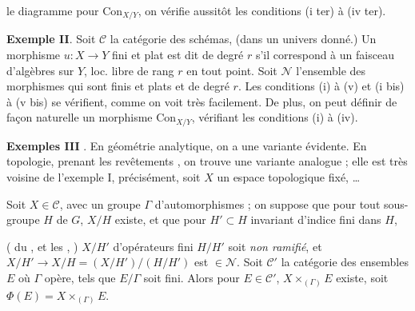 \documentclass[11pt,a4paper]{article}
\begin{document}
le diagramme pour $\mathrm{Con}_{X/Y}$, on vérifie aussitôt les conditions
(i ter) à (iv ter).

\textbf{Exemple II}. Soit $\mathcal{C}$ la catégorie des schémas,
(dans un univers donné.) Un morphisme $u : X \to Y$ fini et plat est dit
de degré $r$ s'il correspond à un \struck{\ill{}} faisceau
  d'algèbres sur $Y$, loc. libre de
 rang $r$ en tout point. Soit $\mathcal{N}$ l'ensemble des
morphismes qui sont finis et plats et \ill{} \ill{} de degré $r$. Les
conditions (i) à (v) et (i bis) à (v bis) se vérifient,
comme on voit  très facilement. De plus, on
peut définir de façon naturelle  un morphisme
$\mathrm{Con}_{X/Y}$, vérifiant les conditions (i) à (iv).

\textbf{Exemples III}  . En géométrie
analytique, on a une variante évidente. En topologie, prenant les
revêtements   \ill{} , on
trouve une variante analogue ; elle est très voisine de l'exemple I,
 précisément, soit $X$ un espace topologique
fixé,  …

Soit $X \in \mathcal{C}$, avec un groupe $\Gamma$ d'automorphismes
 ; on suppose que pour tout sous-groupe $H$
de $G$,  $X/H$ existe, et que pour
$H' \subset H$ invariant d'indice fini dans $H$,

 (\ill{} \ill{}
\ill{} du , et les  \ill{} \ill{}, \ill{} \ill{}) 
$X/H'$  d'opérateurs fini $H/H'$ soit \emph{non ramifié}, et
$X/H' \to X/H = (X/H')/(H/H')$ est $\in \mathcal{N}$. Soit
$\mathcal{C}'$ la catégorie des ensembles $E$ où $\Gamma$ opère, tels que
$E/\Gamma$ soit fini. Alors pour \struck{\ill{}} $E \in \mathcal{C}'$,
$X \times_{(\Gamma)} E$ existe, soit $\Phi(E) = X \times_{(\Gamma)} E$.
\end{document}
